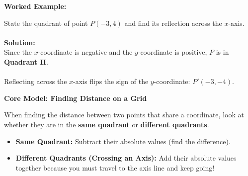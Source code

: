 \documentclass[12pt, letterpaper, fleqn]{article}
\begin{document}
\vspace{2mm}

\begin{tcolorbox}[colback=white, colframe=black!25, boxrule=0.6pt, arc=4mm, left=6mm, right=6mm, top=5mm, bottom=5mm]

\vspace{0.3cm}
\textbf{Worked Example:}

\medskip
\noindent
State the quadrant of point $P(-3, 4)$ and find its reflection across the $x$-axis.\\ \\
\textbf{Solution:} \\
Since the $x$-coordinate is negative and the $y$-coordinate is positive, $P$ is in \textbf{Quadrant II}.\\ \\
Reflecting across the $x$-axis flips the sign of the $y$-coordinate: \textbf{$P'(-3, -4)$}.

\vspace{0.3cm}

\end{tcolorbox}

\vspace{0.8cm}

\begin{tcolorbox}[colback=white, colframe=black!25, boxrule=0.6pt, arc=4mm, left=6mm, right=6mm, top=4mm, bottom=4mm]

\vspace{0.3cm}
\textbf{Core Model: Finding Distance on a Grid}

\medskip
When finding the distance between two points that share a coordinate, look at whether they are in the \textbf{same quadrant} or \textbf{different quadrants}.

\begin{itemize}[itemsep=4pt]
    \item \textbf{Same Quadrant:} Subtract their absolute values (find the difference).
    \item \textbf{Different Quadrants (Crossing an Axis):} Add their absolute values together because you must travel to the axis line and keep going!
\end{itemize}

\vspace{0.3cm}
\end{tcolorbox}
\end{document}
